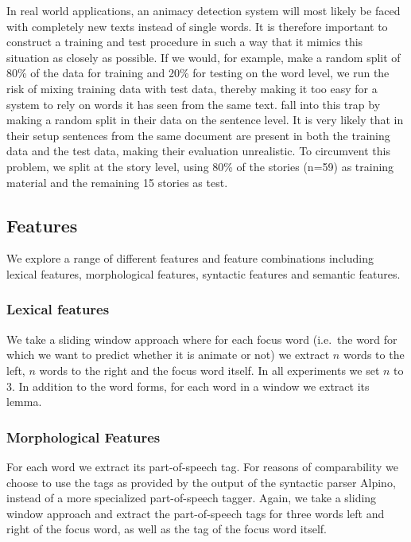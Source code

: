 \documentclass[a4paper,UKenglish]{oasics}
\begin{document}
In real world applications, an animacy detection system will most
likely be faced with completely new texts instead of single words. It
is therefore important to construct a training and test procedure in
such a way that it mimics this situation as closely as possible. If we
would, for example, make a random split of 80\% of the data for training and
20\% for testing on the word level, we run the risk of mixing training
data with test data, thereby making it too easy for a system to rely on words
it has seen from the same text. \cite{bowman:12} fall into this trap
by making a random split in their data on the sentence level. It is
very likely that in their setup sentences from the same document are
present in both the training data and the test data, making their
evaluation unrealistic. To circumvent this problem, we split at the story level, using 80\% of the stories (n=59) as training material and the remaining 15 stories as test.

\subsection{Features}

We explore a range of different features and feature combinations
including lexical features, morphological features, syntactic features
and semantic features.

\subsubsection{Lexical features}
We take a sliding window approach where for each focus word (i.e.\ the
word for which we want to predict whether it is animate or not) we
extract $n$ words to the left, $n$ words to the right and the focus
word itself. In all experiments we set $n$ to 3. In addition to the
word forms, for each word in a window we extract its lemma.

\subsubsection{Morphological Features}
For each word we extract its part-of-speech tag. For reasons of
comparability we choose to use the tags as provided by the output of
the syntactic parser Alpino, instead of a more specialized
part-of-speech tagger. Again, we take a sliding window approach and
extract the part-of-speech tags for three words left and right of the focus word, as well as the tag of the focus word itself.
\end{document}
